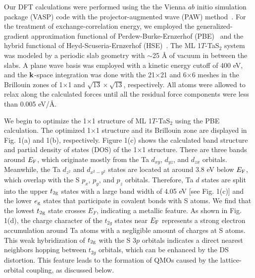 \documentclass[aps,prl,twocolumn,showpacs,byrevtex]{revtex4}
\begin{document}
Our DFT calculations were performed using the the Vienna $ab$ initio simulation package (VASP) code with the projector-augmented wave (PAW) method~\cite{vasp1,vasp2}. For the treatment of exchange-correlation energy, we employed the generalized-gradient approximation functional of Perdew-Burke-Ernzerhof (PBE)~\cite{pbe} and the hybrid functional of Heyd-Scuseria-Ernzerhof (HSE)~\cite{hse}. The ML 1$T$-TaS$_2$ system was modeled by a periodic slab geometry with ${\sim}$25 {\AA} of vacuum in between the slabs. A plane wave basis was employed with a kinetic energy cutoff of 400 eV, and the ${\bf k}$-space integration was done with the 21${\times}$21 and 6${\times}$6 meshes in the Brillouin zones of 1${\times}$1 and ${\sqrt{13}}{\times}{\sqrt{13}}$, respectively. All atoms were allowed to relax along the calculated forces until all the residual force components were less than 0.005 eV/{\AA}.

We begin to optimize the 1${\times}$1 structure of ML 1$T$-TaS$_2$ using the PBE calculation. The optimized 1${\times}$1 structure and its Brillouin zone are displayed in Fig. 1(a) and 1(b), respectively. Figure 1(c) shows the calculated band structure and partial density of states (DOS) of the 1${\times}$1 structure. There are three bands around $E_{\rm F}$, which originate mostly from the Ta $d_{xy}$, $d_{yz}$, and $d_{zx}$ orbitals. Meanwhile, the Ta $d_{z^2}$ and $d_{x^2-y^2}$ states are located at around 3.8 eV below $E_{\rm F}$, which overlap with the S $p_{x}$, $p_{y}$, and $p_{z}$ orbitals. Therefore, Ta $d$ states are split into the upper $t_{\rm 2g}$ states with a large band width of 4.05 eV [see Fig. 1(c)] and the lower $e_{\rm g}$ states that participate in covalent bonds with S atoms. We find that the lowest $t_{\rm 2g}$ state crosses $E_{F}$, indicating a metallic feature. As shown in Fig. 1(d), the charge character of the $t_{2g}$ states near $E_{\rm F}$ represents a strong electron accumulation around Ta atoms with a negligible amount of charges at S atoms. This weak hybridization of $t_{\rm 2g}$ with the S 3$p$ orbitals indicates a direct nearest neighbors hopping between $t_{2g}$ orbitals, which can be enhanced by the DS distortion. This feature leads to the formation of QMOs caused by the lattice-orbital coupling, as discussed below.
\end{document}
